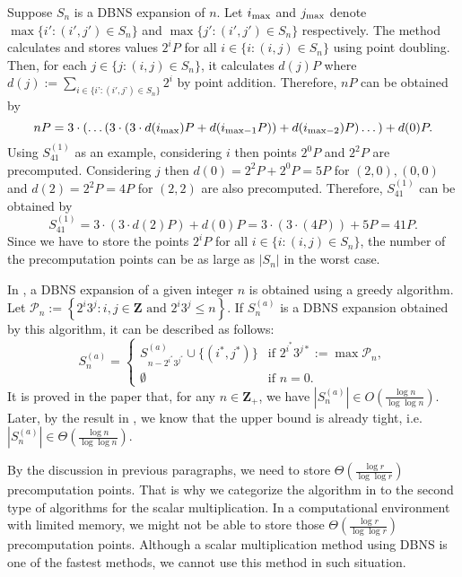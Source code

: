 Suppose $S_n$ is a DBNS expansion of $n$. Let $i_{\rm max}$ and $j_{\rm max}$ denote $\max\{ i' : (i',j') \in S_n \}$ and $\max\{ j' : (i',j') \in S_n \}$ respectively.
The method \cite{dbns} calculates and stores values $2^iP$ for all $i \in \{i : (i, j) \in S_n \}$ using point doubling.
Then, for each $j \in \{j : (i, j) \in S_n \}$, it calculates $d(j)P$ where $d(j) := \sum\limits_{i \in \{i’ : (i',j’) \in S_n\}} 2^i $ by point addition.
Therefore, $nP$ can be obtained by
$$nP = 3\cdot \left( \dots \left( 3 \cdot \left( 3 \cdot d(i_{\rm max})P + d(i_{\mathrm{max} - 1}P) \right) + d(i_{\mathrm{max} - 2})P \right) \dots \right) + d(0)P.$$
Using $S_{41}^{(1)}$ as an example, considering $i$ then points $2^0P$ and $2^2P$ are precomputed.
Considering $j$ then $d(0) = 2^2P + 2^0P = 5P$ for $(2,0),(0,0)$ and $d(2) = 2^2P = 4P$ for $(2,2)$ are also precomputed.
Therefore, $S_{41}^{(1)}$ can be obtained by
$$S_{41}^{(1)} = 3 \cdot \left( 3 \cdot d(2)P  \right) + d(0)P = 3 \cdot \left( 3 \cdot \left( 4P \right)  \right) + 5P = 41P.$$
Since we have to store the points $2^iP$ for all $i \in \{i : (i,j) \in S_n\}$, the number of the precomputation points can be as large as $|S_n|$ in the worst case.

In \cite{dbns2}, a DBNS expansion of a given integer $n$ is obtained using a greedy algorithm.
Let $\mathcal{P}_n := \left\{ 2^i3^j : i,j \in \mathbf{Z} \text{ and } 2^i3^j \leq n \right\}$.
If $S^{(a)}_n$ is a DBNS expansion obtained by this algorithm,
it can be described as follows:
\[
S^{(a)}_n =
\begin{cases}
S^{(a)}_{n - 2^{i^*}3^{j^*}} \cup \{(i^*, j^*)\} & \text{if } 2^{i^*}3^{j*} := \max \mathcal{P}_n, \\
\emptyset       & \text{if } n = 0.
\end{cases}
\]
It is proved in the paper that, for any $n \in \mathbf{Z}_+$, we have $\left|S_n^{(a)}\right| \in O(\frac{\log n}{\log \log n})$.
Later, by the result in \cite{dbns3}, we know that the upper bound is already tight, i.e. $\left|S_n^{(a)}\right| \in \Theta(\frac{\log n}{\log \log n})$.

By the discussion in previous paragraphs, we need to store $\Theta(\frac{\log r}{\log \log r})$ precomputation points.
That is why we categorize the algorithm in \cite{dbns} to the second type of algorithms for the scalar multiplication.
In a computational environment with limited memory, we might not be able to store those $\Theta(\frac{\log r}{\log \log r})$ precomputation points.
Although a scalar multiplication method using DBNS is one of the fastest methods, we cannot use this method in such situation.

